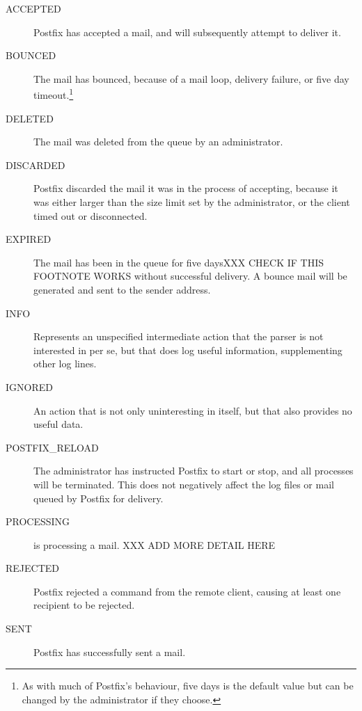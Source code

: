 \label{list of postfix actions}

\begin{description}

    \item [ACCEPTED] Postfix has accepted a mail, and will
        subsequently attempt to deliver it.

    \item [BOUNCED] The mail has bounced, because of a mail loop,
        delivery failure, or five day timeout.\footnote{As with
        much of Postfix's behaviour, five days is the default value
        but can be changed by the administrator if they choose.}

    \item [DELETED] The mail was deleted from the queue by an
        administrator.

    \item [DISCARDED] Postfix discarded the mail it was in the
        process of accepting, because it was either larger than the
        size limit set by the administrator, or the client timed
        out or disconnected.

    \item [EXPIRED] The mail has been in the queue for five
        days\footnotemark[\value{footnote}] XXX CHECK IF THIS
        FOOTNOTE WORKS without successful delivery.  A bounce mail
        will be generated and sent to the sender address.

    \item [INFO] Represents an unspecified intermediate action that
        the parser is not interested in per se, but that does log
        useful information, supplementing other log lines.

    \item [IGNORED] An action that is not only uninteresting in
        itself, but that also provides no useful data.

    \item [POSTFIX\_RELOAD] The administrator has instructed
        Postfix to start or stop, and all  processes
        will be terminated.  This does not negatively affect the
        log files or mail queued by Postfix for delivery.

    \item [PROCESSING]  is processing a mail.
        XXX ADD MORE DETAIL HERE

    \item [REJECTED] Postfix rejected a command from the remote
        client, causing at least one recipient to be rejected.

    \item [SENT] Postfix has successfully sent a mail.

\end{description}

